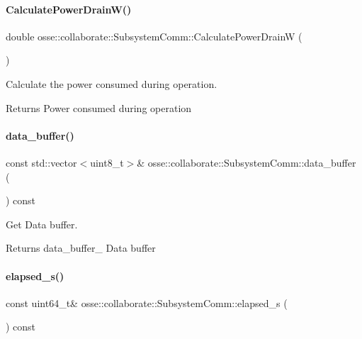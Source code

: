 \paragraph{\texorpdfstring{Calculate\+Power\+Drain\+W()}{CalculatePowerDrainW()}}
{\footnotesize\ttfamily double osse\+::collaborate\+::\+Subsystem\+Comm\+::\+Calculate\+Power\+DrainW (\begin{DoxyParamCaption}{ }\end{DoxyParamCaption})}



Calculate the power consumed during operation. 

\begin{DoxyReturn}{Returns}
Power consumed during operation 
\end{DoxyReturn}
\mbox{\label{classosse_1_1collaborate_1_1_subsystem_comm_ab42ca920118cc2a528ef7dd8360f6e64}} 
\paragraph{\texorpdfstring{data\+\_\+buffer()}{data\_buffer()}}
{\footnotesize\ttfamily const std\+::vector$<$uint8\+\_\+t$>$\& osse\+::collaborate\+::\+Subsystem\+Comm\+::data\+\_\+buffer (\begin{DoxyParamCaption}{ }\end{DoxyParamCaption}) const\hspace{0.3cm}{\ttfamily [inline]}}



Get Data buffer. 

\begin{DoxyReturn}{Returns}
data\+\_\+buffer\+\_\+ Data buffer 
\end{DoxyReturn}
\mbox{\label{classosse_1_1collaborate_1_1_subsystem_comm_a688d10c873c2a5992b88ed5b9ba6b369}} 
\paragraph{\texorpdfstring{elapsed\+\_\+s()}{elapsed\_s()}}
{\footnotesize\ttfamily const uint64\+\_\+t\& osse\+::collaborate\+::\+Subsystem\+Comm\+::elapsed\+\_\+s (\begin{DoxyParamCaption}{ }\end{DoxyParamCaption}) const\hspace{0.3cm}{\ttfamily [inline]}}




